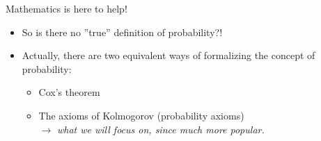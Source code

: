 \documentclass[a4,11pt]{beamer}
\newlength{\wideitemsep}
\let\olditem\item
\renewcommand{\item}{\setlength{\itemsep}{\wideitemsep}\olditem}
\begin{document}
\begin{frame}{Mathematics is here to help!}
    \begin{itemize}
        \item So is there no ''true'' definition of probability?!
        \item Actually, there are two equivalent ways of formalizing the concept of probability:\bigskip\\\begin{itemize}
            \item \textcolor{blueberry}{Cox's theorem}\vspace{-.1cm}\\
            \item \textcolor{blueberry}{The axioms of Kolmogorov (probability axioms)} \\
            $\rightarrow$ \emph{what we will focus on, since much more popular.}
        \end{itemize}
        \end{itemize}
        \end{frame}
        
\end{document}
